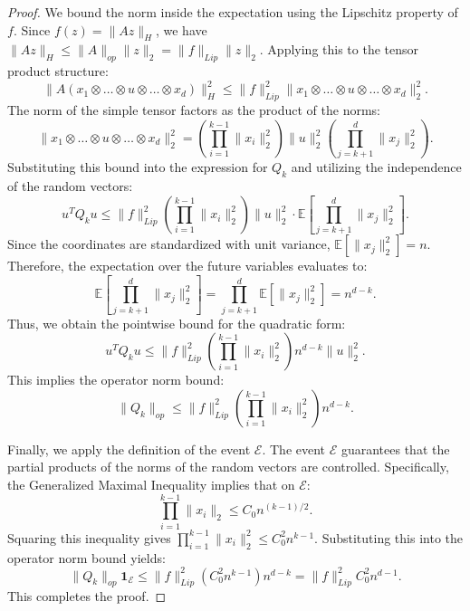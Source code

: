 \documentclass[11pt]{amsart}
\theoremstyle{definition}
\theoremstyle{remark}
\begin{document}
\begin{proof}
We bound the norm inside the expectation using the Lipschitz property of $f$. Since $f(z) = \|Az\|_H$, we have $\|Az\|_H \le \|A\|_{op} \|z\|_2 = \|f\|_{Lip} \|z\|_2$. Applying this to the tensor product structure:
\begin{equation}
\| A(x_1 \otimes \dots \otimes u \otimes \dots \otimes x_d) \|_H^2 \le \|f\|_{Lip}^2 \| x_1 \otimes \dots \otimes u \otimes \dots \otimes x_d \|_2^2.
\end{equation}
The norm of the simple tensor factors as the product of the norms:
\begin{equation}
\| x_1 \otimes \dots \otimes u \otimes \dots \otimes x_d \|_2^2 = \left( \prod_{i=1}^{k-1} \|x_i\|_2^2 \right) \|u\|_2^2 \left( \prod_{j=k+1}^d \|x_j\|_2^2 \right).
\end{equation}
Substituting this bound into the expression for $Q_k$ and utilizing the independence of the random vectors:
\begin{equation}
u^T Q_k u \le \|f\|_{Lip}^2 \left( \prod_{i=1}^{k-1} \|x_i\|_2^2 \right) \|u\|_2^2 \cdot \mathbb{E} \left[ \prod_{j=k+1}^d \|x_j\|_2^2 \right].
\end{equation}
Since the coordinates are standardized with unit variance, $\mathbb{E}[\|x_j\|_2^2] = n$. Therefore, the expectation over the future variables evaluates to:
\begin{equation}
\mathbb{E} \left[ \prod_{j=k+1}^d \|x_j\|_2^2 \right] = \prod_{j=k+1}^d \mathbb{E}[\|x_j\|_2^2] = n^{d-k}.
\end{equation}
Thus, we obtain the pointwise bound for the quadratic form:
\begin{equation}
u^T Q_k u \le \|f\|_{Lip}^2 \left( \prod_{i=1}^{k-1} \|x_i\|_2^2 \right) n^{d-k} \|u\|_2^2.
\end{equation}
This implies the operator norm bound:
\begin{equation}
\|Q_k\|_{op} \le \|f\|_{Lip}^2 \left( \prod_{i=1}^{k-1} \|x_i\|_2^2 \right) n^{d-k}.
\end{equation}

Finally, we apply the definition of the event $\mathcal{E}$. The event $\mathcal{E}$ guarantees that the partial products of the norms of the random vectors are controlled. Specifically, the Generalized Maximal Inequality implies that on $\mathcal{E}$:
\begin{equation}
\prod_{i=1}^{k-1} \|x_i\|_2 \le C_0 n^{(k-1)/2}.
\end{equation}
Squaring this inequality gives $\prod_{i=1}^{k-1} \|x_i\|_2^2 \le C_0^2 n^{k-1}$. Substituting this into the operator norm bound yields:
\begin{equation}
\|Q_k\|_{op} \mathbf{1}_{\mathcal{E}} \le \|f\|_{Lip}^2 (C_0^2 n^{k-1}) n^{d-k} = \|f\|_{Lip}^2 C_0^2 n^{d-1}.
\end{equation}
This completes the proof.
\end{proof}
\end{document}
